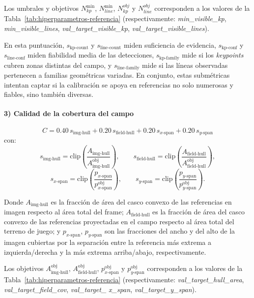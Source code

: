 Los umbrales y objetivos \(N_{kp}^{\min}\), \(N_{line}^{\min}\), \(N_{kp}^{obj}\) y \(N_{line}^{obj}\) corresponden a los valores de la Tabla~\ref{tab:hiperparametros-referencia} (respectivamente: \textit{min\_visible\_kp}, \textit{min\_visible\_lines}, \textit{val\_target\_visible\_kp}, \textit{val\_target\_visible\_lines}).

En esta puntuación, \(s_{\text{kp-count}}\) y \(s_{\text{line-count}}\) miden suficiencia de evidencia, \(s_{\text{kp-conf}}\) y \(s_{\text{line-conf}}\) miden fiabilidad media de las detecciones, \(s_{\text{kp-family}}\) mide si los \textit{keypoints} cubren zonas distintas del campo, y \(s_{\text{line-family}}\) mide si las líneas observadas pertenecen a familias geométricas variadas. En conjunto, estas submétricas intentan captar si la calibración se apoya en referencias no solo numerosas y fiables, sino también diversas.

\paragraph{3) Calidad de la cobertura del campo}
\[
C = 0.40\,s_{\text{img-hull}} + 0.20\,s_{\text{field-hull}} + 0.20\,s_{x\text{-span}} + 0.20\,s_{y\text{-span}}
\]
con:
\[
s_{\text{img-hull}}=\mathrm{clip}\!\left(\frac{A_{\text{img-hull}}}{A_{\text{img-hull}}^{\text{obj}}}\right),\qquad
s_{\text{field-hull}}=\mathrm{clip}\!\left(\frac{A_{\text{field-hull}}}{A_{\text{field-hull}}^{\text{obj}}}\right),
\]
\[
s_{x\text{-span}}=\mathrm{clip}\!\left(\frac{p_{x\text{-span}}}{p_{x\text{-span}}^{\text{obj}}}\right),\qquad
s_{y\text{-span}}=\mathrm{clip}\!\left(\frac{p_{y\text{-span}}}{p_{y\text{-span}}^{\text{obj}}}\right).
\]

Donde \(A_{\text{img-hull}}\) es la fracción de área del casco convexo de las referencias en imagen respecto al área total del frame; \(A_{\text{field-hull}}\) es la fracción de área del casco convexo de las referencias proyectadas en el campo respecto al área total del terreno de juego; y \(p_{x\text{-span}}\), \(p_{y\text{-span}}\) son las fracciones del ancho y del alto de la imagen cubiertas por la separación entre la referencia más extrema a izquierda/derecha y la más extrema arriba/abajo, respectivamente.

Los objetivos \(A_{\text{img-hull}}^{\text{obj}}\), \(A_{\text{field-hull}}^{\text{obj}}\), \(p_{x\text{-span}}^{\text{obj}}\) y \(p_{y\text{-span}}^{\text{obj}}\) corresponden a los valores de la Tabla~\ref{tab:hiperparametros-referencia} (respectivamente: \textit{val\_target\_hull\_area}, \textit{val\_target\_field\_cov}, \textit{val\_target\_} \textit{x\_span}, \textit{val\_target\_y\_span}).

